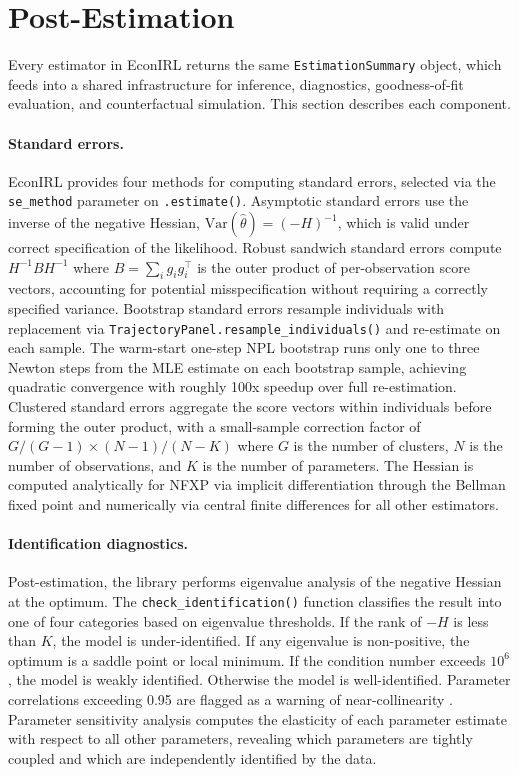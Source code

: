 \section{Post-Estimation}
\label{sec:post_estimation}

Every estimator in EconIRL returns the same \texttt{EstimationSummary} object, which feeds into a shared infrastructure for inference, diagnostics, goodness-of-fit evaluation, and counterfactual simulation.
This section describes each component.

\paragraph{Standard errors.}
EconIRL provides four methods for computing standard errors, selected via the \texttt{se\_method} parameter on \texttt{.estimate()}.
Asymptotic standard errors use the inverse of the negative Hessian, $\mathrm{Var}(\hat\theta) = (-H)^{-1}$, which is valid under correct specification of the likelihood.
Robust sandwich standard errors compute $H^{-1}BH^{-1}$ where $B = \sum_i g_i g_i^\top$ is the outer product of per-observation score vectors, accounting for potential misspecification without requiring a correctly specified variance.
Bootstrap standard errors resample individuals with replacement via \texttt{TrajectoryPanel.resample\_individuals()} and re-estimate on each sample.
The warm-start one-step NPL bootstrap runs only one to three Newton steps from the MLE estimate on each bootstrap sample, achieving quadratic convergence with roughly 100x speedup over full re-estimation.
Clustered standard errors aggregate the score vectors within individuals before forming the outer product, with a small-sample correction factor of $G/(G-1) \times (N-1)/(N-K)$ where $G$ is the number of clusters, $N$ is the number of observations, and $K$ is the number of parameters.
The Hessian is computed analytically for NFXP via implicit differentiation through the Bellman fixed point \citep{iskhakov2016} and numerically via central finite differences for all other estimators.

\paragraph{Identification diagnostics.}
Post-estimation, the library performs eigenvalue analysis of the negative Hessian at the optimum.
The \texttt{check\_identification()} function classifies the result into one of four categories based on eigenvalue thresholds.
If the rank of $-H$ is less than $K$, the model is under-identified.
If any eigenvalue is non-positive, the optimum is a saddle point or local minimum.
If the condition number exceeds $10^6$, the model is weakly identified.
Otherwise the model is well-identified.
Parameter correlations exceeding 0.95 are flagged as a warning of near-collinearity \citep{magnacThesmar2002}.
Parameter sensitivity analysis computes the elasticity of each parameter estimate with respect to all other parameters, revealing which parameters are tightly coupled and which are independently identified by the data.

